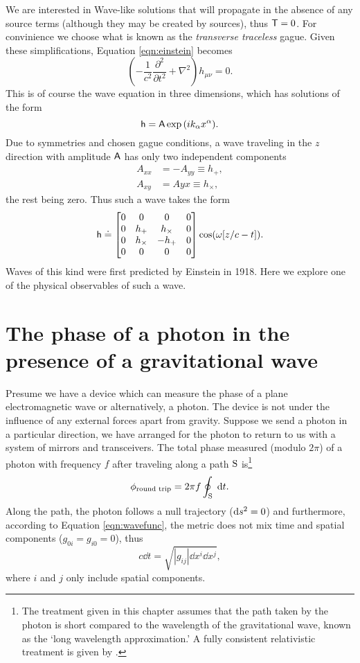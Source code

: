 We are interested in Wave-like solutions that will propagate in the absence of any source terms (although they may be created by sources), thus $\mathsf{T}=0$. %
For convinience we choose what is known as the \emph{transverse traceless} gague. %
Given these simplifications, Equation \ref{eqn:einstein} becomes
\begin{equation}
\left(-\frac{1}{c^2}\frac{\partial^2}{\partial t^2}+\nabla^2\right)h_{\mu \nu}=0.
\end{equation}
This is of course the wave equation in three dimensions, which has solutions of the form
\begin{equation}
\mathsf{h}=\mathsf{A}\exp{(ik_\alpha x^\alpha)}.
\end{equation}
Due to symmetries and chosen gague conditions, a wave traveling in the $z$ direction with amplitude $\mathsf{A}$ has only two independent components \cite[Chap. %
9]{schutz1985first}
\begin{align*}
A_{xx}&=-A_{yy}\equiv h_+,\\
A_{xy}&=A{yx}\equiv h_\times,
\end{align*}
the rest being zero. %
Thus such a wave takes the form
\begin{equation}
\label{eqn:wavefunc}
\mathsf{h} \doteq 
\left[\begin{matrix}
0 & 0 & 0 & 0 \\
0 & h_+ & h_\times & 0 \\
0 & h_\times & -h_+ & 0 \\
0 & 0 & 0 & 0
\end{matrix}\right]
\cos(\omega [z/c- t]).
\end{equation}
Waves of this kind were first predicted by Einstein in 1918. %
Here we explore one of the physical observables of such a wave.

\section{The phase of a photon in the presence of a gravitational wave}
Presume we have a device which can measure the phase of a plane electromagnetic wave or alternatively, a photon. %
The device is not under the influence of any external forces apart from gravity. %
Suppose we send a photon in a particular direction, we have arranged for the photon to return to us with a system of mirrors and transceivers. %
The total phase measured (modulo $2\pi$) of a photon with frequency $f$ after traveling along a path $\rm S$ is\footnote{The treatment given in this chapter assumes that the path taken by the photon is short compared to the wavelength of the gravitational wave, known as the `long wavelength approximation.' A fully consistent relativistic treatment is given by \citet{RakhmanovPhoton}.}
\begin{equation}
\phi_{\text{round trip}} = 2\pi f\oint_{\rm S} \; \mathrm{d} t.
\end{equation}
Along the path, the photon follows a null trajectory ($\mathrm{d} s^2=0$) and furthermore, according to Equation \ref{eqn:wavefunc}, the metric does not mix time and spatial components ($g_{0i}=g_{i0}=0$), thus
\begin{equation}
c\dd t = \sqrt{|g_{ij}|\dd x^i \dd x^j},
\end{equation}
where $i$ and $j$ only include spatial components.

